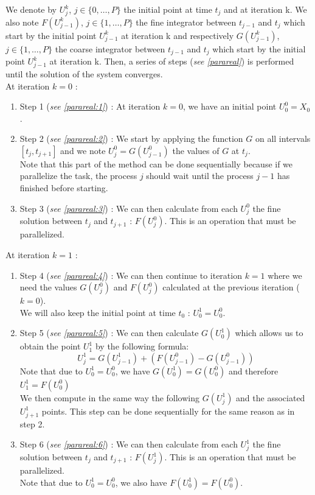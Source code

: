 \noindent We denote by $U_j^k$, $j\in\{0,\dots,P\}$ the initial point at time $t_j$ and at iteration k. We also note $F(U_{j-1}^k)$, $j\in\{1,\dots,P\}$ the fine integrator between $t_{j-1}$ and $t_j$ which start by the initial point $U_{j-1}^k$ at iteration k and respectively $G(U_{j-1}^k)$, $j\in\{1,\dots,P\}$ the coarse integrator between $t_{j-1}$ and $t_j$ which start by the initial point $U_{j-1}^k$ at iteration k. Then, a series of steps (\textit{see \ref{parareal}}) is performed until the solution of the system converges. \\

\noindent At iteration $k=0$ :
\begin{enumerate}[label=\textbullet]	
	\item Step 1 (\textit{see \ref{parareal:1}}) : At iteration $k=0$, we have an initial point $U_0^0=X_0$.
	\item Step 2 (\textit{see \ref{parareal:2}}) : We start by applying the function $G$ on all intervals $[t_j,t_{j+1}]$ and we note $U_j^0=G(U_{j-1}^0)$ the values of $G$ at $t_j$. \\
	Note that this part of the method can be done sequentially because if we parallelize the task, the process $j$ should wait until the process $j-1$ has finished before starting.
	\item Step 3 (\textit{see \ref{parareal:3}}) : We can then calculate from each $U_j^0$ the fine solution between $t_j$ and $t_{j+1}$ : $F(U_j^0)$. This is an operation that must be parallelized.
\end{enumerate}

\noindent At iteration $k=1$ :
\begin{enumerate}[label=\textbullet]	
	\item Step 4 (\textit{see \ref{parareal:4}}) : We can then continue to iteration $k=1$ where we need the values $G(U_j^0)$ and $F(U_j^0)$ calculated at the previous iteration ($k=0$). \\
	We will also keep the initial point at time $t_0$ : $U_0^1=U_0^0$.
	\item Step 5 (\textit{see \ref{parareal:5}}) : We can then calculate $G(U_0^1)$ which allows us to obtain the point $U_1^1$ by the following formula:
	$$U_j^1=G(U_{j-1}^1)+(F(U_{j-1}^0)-G(U_{j-1}^0))$$
	Note that due to $U_0^1=U_0^0$, we have $G(U_0^1)=G(U_0^0)$ and therefore $U_1^1=F(U_0^0)$ \\
	We then compute in the same way the following $G(U_j^1)$ and the associated $U_{j+1}^1$ points. This step can be done sequentially for the same reason as in step 2.
	\item Step 6 (\textit{see \ref{parareal:6}}) : We can then calculate from each $U_j^1$ the fine solution between $t_j$ and $t_{j+1}$ : $F(U_j^1)$. This is an operation that must be parallelized. \\
	Note that due to $U_0^1=U_0^0$, we also have $F(U_0^1)=F(U_0^0)$.
\end{enumerate}

